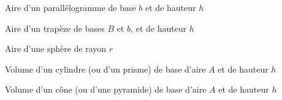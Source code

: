 \documentclass[10pt,class=article,crop=false]{standalone}
\begin{document}
\begin{multicols}{2}
\bigskip 
 
\begin{center}
Aire d'un parallélogramme de base $b$ et de hauteur $h$	
	
	\begin{minipage}{0.2\textwidth}	
	\end{minipage}
	\begin{minipage}{0.25\textwidth}
	\end{minipage}
\end{center}

\bigskip	

\begin{center}
	Aire d'un trapèze de bases $B$ et $b$, et de hauteur $h$
	
	\begin{minipage}{0.2\textwidth}	
	\end{minipage}
	\begin{minipage}{0.25\textwidth}
	\end{minipage}
\end{center}

\bigskip


\begin{center}
Aire d'une sphère de rayon $r$

	\begin{minipage}{0.2\textwidth}	
	\end{minipage}
	\begin{minipage}{0.25\textwidth}
	\end{minipage}
\end{center}

\bigskip

\begin{center}
Volume d'un cylindre (ou d'un prisme) de base d'aire $A$ et de hauteur $h$	
	
	\begin{minipage}{0.2\textwidth}	
	\end{minipage}
	\begin{minipage}{0.25\textwidth}
	\end{minipage}
\end{center}

\bigskip

\begin{center}
Volume d'un cône (ou d'une pyramide) de base d'aire $A$ et de hauteur $h$	
	

\end{center}
\end{multicols}
\end{document}
